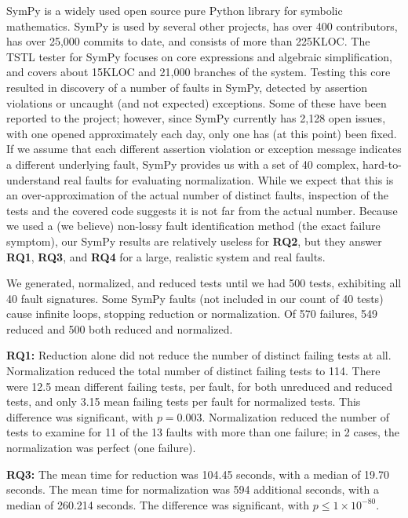 SymPy \cite{SymPy} is a widely used open source pure Python library
for symbolic mathematics.  SymPy is used by several other projects,
has over 400 contributors, has over 25,000 commits to date, and consists
of more than
225KLOC.  The TSTL tester for SymPy focuses on core expressions and
algebraic simplification, and covers about 15KLOC and 21,000 branches of
the system.  Testing this core resulted in discovery of a number
of faults in SymPy, detected by assertion violations or uncaught (and
not expected) exceptions.  Some of these have been reported to the project;
however, since SymPy currently has 2,128 open issues, with one opened
approximately each day, only one has (at this point) been fixed.  If we assume that
each different assertion violation or exception message indicates a
different underlying fault, SymPy provides us with a set of 40
complex, hard-to-understand real faults for evaluating normalization.
While we expect that this is an over-approximation of the actual
number of distinct faults, inspection of the tests and the covered
code suggests it is not far from the actual number.  Because we used a
(we believe)
non-lossy fault identification method (the exact failure symptom), our
SymPy results are relatively useless for {\bf RQ2}, but they answer {\bf RQ1}, {\bf RQ3}, and {\bf RQ4} for a large, realistic
system and real faults.

We generated, normalized, and reduced tests until we had 500 tests,
exhibiting all 40 fault signatures.    Some SymPy faults (not
included in our count of 40 tests) cause infinite loops, stopping
reduction or normalization. Of 570 failures, 549 reduced
and 500 both reduced and normalized.

{\bf RQ1:} Reduction alone did not reduce the number of distinct failing tests at
all.  Normalization reduced the total number of distinct
failing tests to 114.  There were
12.5 mean different failing tests, per fault, for both unreduced and
reduced tests, and only 3.15 mean failing tests per fault for
normalized tests.  This difference was significant, with $p=0.003$.
Normalization reduced the number of tests to
examine for 11 of the 13 faults with more than one failure; in 2 cases, the normalization was perfect (one failure).

{\bf RQ3:} The mean time for reduction was 104.45 seconds, with a
median of 19.70 seconds.  The mean time for normalization was
594 additional seconds, with a median of 260.214 seconds.  The
difference was significant, with $p\leq1\times10^{-80}$.

